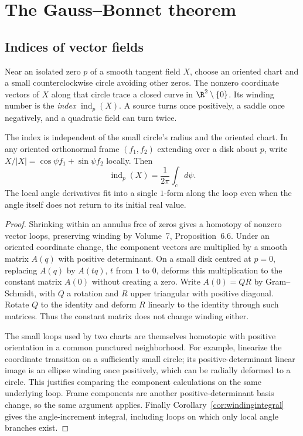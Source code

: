 \section{The Gauss--Bonnet theorem}

\subsection*{Indices of vector fields}

Near an isolated zero $p$ of a smooth tangent field $X$, choose an oriented chart and a small counterclockwise circle avoiding other zeros. The nonzero coordinate vectors of $X$ along that circle trace a closed curve in $\R^2\setminus\{0\}$. Its winding number is the \emph{index} $\operatorname{ind}_p(X)$. A source turns once positively, a saddle once negatively, and a quadratic field can turn twice.

\begin{lemma}\label{lem:index}
The index is independent of the small circle's radius and the oriented chart. In any oriented orthonormal frame $(f_1,f_2)$ extending over a disk about $p$, write $X/|X|=\cos\psi f_1+\sin\psi f_2$ locally. Then
\[
\operatorname{ind}_p(X)=\frac1{2\pi}\int_c d\psi.
\]
The local angle derivatives fit into a single $1$-form along the loop even when the angle itself does not return to its initial real value.
\end{lemma}

\begin{proof}
Shrinking within an annulus free of zeros gives a homotopy of nonzero vector loops, preserving winding by Volume~7, Proposition~6.6. Under an oriented coordinate change, the component vectors are multiplied by a smooth matrix $A(q)$ with positive determinant. On a small disk centred at $p=0$, replacing $A(q)$ by $A(tq)$, $t$ from $1$ to $0$, deforms this multiplication to the constant matrix $A(0)$ without creating a zero. Write $A(0)=QR$ by Gram--Schmidt, with $Q$ a rotation and $R$ upper triangular with positive diagonal. Rotate $Q$ to the identity and deform $R$ linearly to the identity through such matrices. Thus the constant matrix does not change winding either.

The small loops used by two charts are themselves homotopic with positive orientation in a common punctured neighborhood. For example, linearize the coordinate transition on a sufficiently small circle; its positive-determinant linear image is an ellipse winding once positively, which can be radially deformed to a circle. This justifies comparing the component calculations on the same underlying loop. Frame components are another positive-determinant basis change, so the same argument applies. Finally Corollary~\ref{cor:windingintegral} gives the angle-increment integral, including loops on which only local angle branches exist.
\end{proof}

